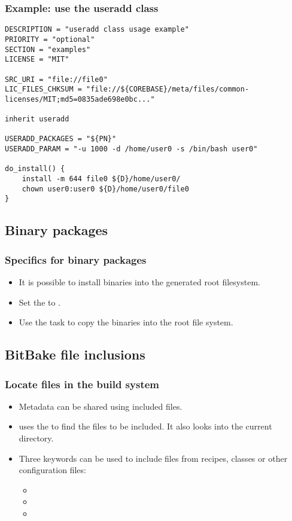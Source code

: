 \begin{frame}[fragile]
  \frametitle{Example: use the useradd class}
  \begin{block}{}
    \begin{verbatim}
DESCRIPTION = "useradd class usage example"
PRIORITY = "optional"
SECTION = "examples"
LICENSE = "MIT"

SRC_URI = "file://file0"
LIC_FILES_CHKSUM = "file://${COREBASE}/meta/files/common-licenses/MIT;md5=0835ade698e0bc..."

inherit useradd

USERADD_PACKAGES = "${PN}"
USERADD_PARAM = "-u 1000 -d /home/user0 -s /bin/bash user0"

do_install() {
    install -m 644 file0 ${D}/home/user0/
    chown user0:user0 ${D}/home/user0/file0
}
    \end{verbatim}
  \end{block}
\end{frame}

\subsection{Binary packages}

\begin{frame}
  \frametitle{Specifics for binary packages}
  \begin{itemize}
    \item It is possible to install binaries into the generated root
      filesystem.
    \item Set the  to .
    \item Use the  task to copy the binaries into the
      root file system.
  \end{itemize}
\end{frame}

\subsection{BitBake file inclusions}

\begin{frame}
  \frametitle{Locate files in the build system}
  \begin{itemize}
    \item Metadata can be shared using included files.
    \item {} uses the  to find the files to
      be included. It also looks into the current directory.
    \item Three keywords can be used to include files from recipes,
      classes or other configuration files:
      \begin{itemize}
        \item {}
        \item {}
        \item {}
      \end{itemize}
  \end{itemize}
\end{frame}

